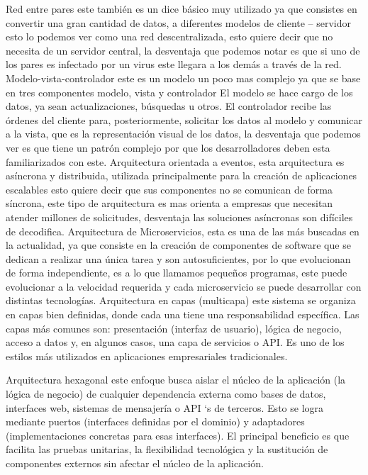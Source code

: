 \documentclass[11pt,letterpaper]{article}
\begin{document}
Red entre pares este también es un dice básico muy utilizado ya que consistes en convertir una gran cantidad de datos, a diferentes modelos de cliente – servidor esto lo podemos ver como una red descentralizada, esto quiere decir que no necesita de un servidor central, la desventaja que podemos notar es que si uno de los pares es infectado por un virus este llegara a los demás a través de la red.
Modelo-vista-controlador este es un modelo un poco mas complejo ya que se base en tres componentes modelo, vista y controlador El modelo se hace cargo de los datos, ya sean actualizaciones, búsquedas u otros. El controlador recibe las órdenes del cliente para, posteriormente, solicitar los datos al modelo y comunicar a la vista, que es la representación visual de los datos, la desventaja que podemos ver es que tiene un patrón complejo por que los desarrolladores deben esta familiarizados con este.
Arquitectura orientada a eventos, esta arquitectura es asíncrona y distribuida, utilizada principalmente para la creación de aplicaciones escalables esto quiere decir que sus componentes no se comunican de forma síncrona, este tipo de arquitectura es mas orienta a empresas que necesitan atender millones de solicitudes, desventaja las soluciones asíncronas son difíciles de decodifica.
Arquitectura de Microservicios, esta es una de las más buscadas en la actualidad, ya que consiste en la creación de componentes de software que se dedican a realizar una única tarea y son autosuficientes, por lo que evolucionan de forma independiente, es a lo que llamamos pequeños programas, este puede evolucionar a la velocidad requerida y cada microservicio se puede desarrollar con distintas tecnologías.
Arquitectura en capas (multicapa) este sistema se organiza en capas bien definidas, donde cada una tiene una responsabilidad específica. Las capas más comunes son: presentación (interfaz de usuario), lógica de negocio, acceso a datos y, en algunos casos, una capa de servicios o API. Es uno de los estilos más utilizados en aplicaciones empresariales tradicionales.

Arquitectura hexagonal este enfoque busca aislar el núcleo de la aplicación (la lógica de negocio) de cualquier dependencia externa como bases de datos, interfaces web, sistemas de mensajería o API `s de terceros. Esto se logra mediante puertos (interfaces definidas por el dominio) y adaptadores (implementaciones concretas para esas interfaces). El principal beneficio es que facilita las pruebas unitarias, la flexibilidad tecnológica y la sustitución de componentes externos sin afectar el núcleo de la aplicación. 
\end{document}

